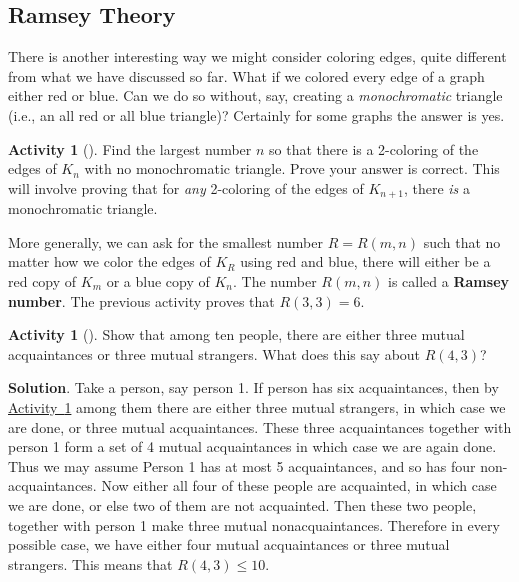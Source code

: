 \documentclass[10pt,]{book}
\newcommand{\terminology}[1]{\textbf{#1}}
\theoremstyle{plain}
\theoremstyle{definition}
\theoremstyle{definition}
\theoremstyle{definition}
\newtheorem{activity}[project]{Activity}
\numberwithin{equation}{chapter}
\begin{document}
\subsection[{Ramsey Theory}]{Ramsey Theory}\label{subsec-}
\hypertarget{p-409}{}%
There is another interesting way we might consider coloring edges, quite different from what we have discussed so far. What if we colored every edge of a graph either red or blue. Can we do so without, say, creating a \emph{monochromatic} triangle (i.e., an all red or all blue triangle)? Certainly for some graphs the answer is yes.%
\begin{activity}[]\label{act_R-3-3}
\hypertarget{p-410}{}%
Find the largest number \(n\) so that there is a 2-coloring of the edges of \(K_n\) with no monochromatic triangle.  Prove your answer is correct.  This will involve proving that for \emph{any} 2-coloring of the edges of \(K_{n+1}\), there \emph{is} a monochromatic triangle.%
\end{activity}
\hypertarget{p-411}{}%
More generally, we can ask for the smallest number \(R = R(m,n)\) such that no matter how we color the edges of \(K_R\) using red and blue, there will either be a red copy of \(K_m\) or a blue copy of \(K_n\).  The number \(R(m,n)\) is called a \terminology{Ramsey number}.  The previous activity proves that \(R(3,3) = 6\).%
\begin{activity}[]\label{activity-42}
\hypertarget{p-412}{}%
Show that among ten people, there are either three mutual acquaintances or three mutual strangers.  What does this say about \(R(4,3)\)?%
\par\smallskip%
\noindent\textbf{Solution}.\hypertarget{solution-29}{}\quad%
\hypertarget{p-413}{}%
Take a person, say person 1. If person has six acquaintances, then by \hyperref[act_R-3-3]{Activity~\ref{act_R-3-3}} among them there are either three mutual strangers, in which case we are done, or three mutual acquaintances. These three acquaintances together with person 1 form a set of 4 mutual acquaintances in which case we are again done. Thus we may assume Person 1 has at most 5 acquaintances, and so has four non-acquaintances. Now either all four of these people are acquainted, in which case we are done, or else two of them are not acquainted. Then these two people, together with person 1 make three mutual nonacquaintances. Therefore in every possible case, we have either four mutual acquaintances or three mutual strangers. This means that \(R(4,3) \le 10\).%
\end{activity}
\end{document}
